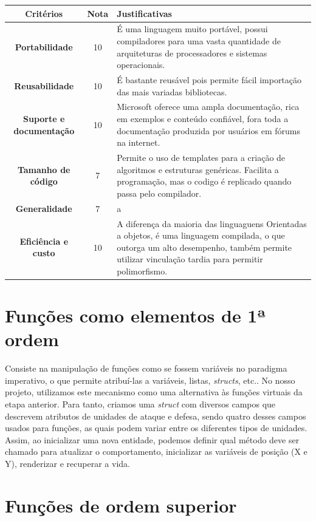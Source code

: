 \documentclass[rel_mlp]{iiufrgs}
\begin{document}
 \begin{center}
\begin{tabular}{ |c|c|p{80mm} } 
\hline
	\textbf{Critérios} & \textbf{Nota} & \textbf{Justificativas} \\
\hline
\textbf{Portabilidade} & 10 & É uma linguagem muito portável, possui compiladores para uma vasta quantidade de arquiteturas de processadores e sistemas operacionais. \\
\textbf{Reusabilidade} & 10 & É bastante reusável pois permite fácil importação das mais variadas bibliotecas. \\
\textbf{Suporte e documentação} & 10 & Microsoft oferece uma ampla documentação, rica em exemplos e conteúdo confiável, fora toda a documentação produzida por usuários em fórums na internet. \\ 
\textbf{Tamanho de código} & 7 & Permite o uso de templates para a criação de algoritmos e estruturas genéricas. Facilita a programação, mas o codigo é replicado quando passa pelo compilador. \\
\textbf{Generalidade} & 7 & a \\
\textbf{Eficiência e custo} & 10 & A diferença da maioria das linguaguens Orientadas a objetos, é uma linguagem compilada, o que outorga um alto desempenho, também permite utilizar vinculação tardia para permitir polimorfismo. \\
\hline
\end{tabular}
\end{center}
 
 \section{Funções como elementos de 1ª ordem}
 
	Consiste na manipulação de funções como se fossem variáveis no paradigma imperativo, o que permite atribuí-las a variáveis, listas, \textit{structs}, etc.. No nosso projeto, utilizamos este mecanismo como uma alternativa às funções virtuais da etapa anterior. Para tanto, criamos uma \textit{struct} com diversos campos que descrevem atributos de unidades de ataque e defesa, sendo quatro desses campos usados para funções, as quais podem variar entre os diferentes tipos de unidades. Assim, ao inicializar uma nova entidade, podemos definir qual método deve ser chamado para atualizar o comportamento, inicializar as variáveis de posição (X e Y), renderizar e recuperar a vida.

 \section{Funções de ordem superior}
	
\end{document}
